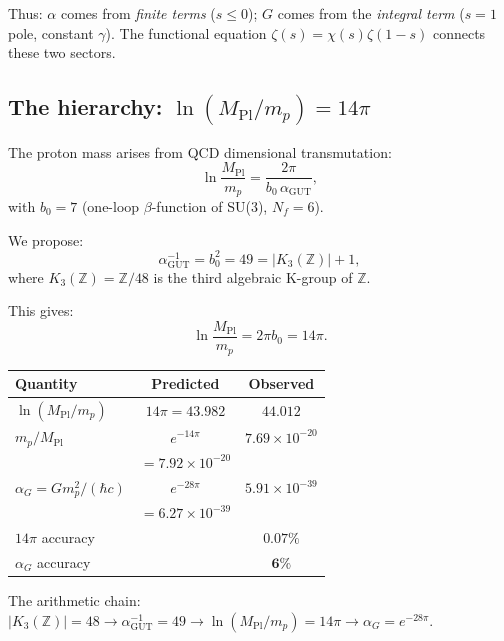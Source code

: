 \documentclass[aps,prd,twocolumn,superscriptaddress,nofootinbib]{revtex4-2}
\begin{document}
Thus: $\alpha$ comes from \emph{finite terms} ($s\leq 0$);
$G$ comes from the \emph{integral term} ($s=1$ pole, constant
$\gamma$).  The functional equation
$\zeta(s)=\chi(s)\zeta(1{-}s)$ connects these two sectors.

\subsection{The hierarchy: $\ln(M_{\mathrm{Pl}}/m_p)=14\pi$}

The proton mass arises from QCD dimensional transmutation:
\begin{equation}
  \ln\frac{M_{\mathrm{Pl}}}{m_p}=\frac{2\pi}{b_0\,\alpha_{\mathrm{GUT}}},
\end{equation}
with $b_0=7$ (one-loop $\beta$-function of SU(3), $N_f=6$).

We propose:
\begin{equation}\label{eq:alphaGUT}
  \alpha_{\mathrm{GUT}}^{-1}=b_0^2=49=|K_3(\mathbb{Z})|+1,
\end{equation}
where $K_3(\mathbb{Z})=\mathbb{Z}/48$ is the third algebraic
K-group of $\mathbb{Z}$.

This gives:
\begin{equation}\label{eq:14pi}
  \ln\frac{M_{\mathrm{Pl}}}{m_p}=2\pi b_0=14\pi.
\end{equation}

\begin{center}
\begin{tabular}{lcc}
\toprule
Quantity & Predicted & Observed \\
\midrule
$\ln(M_{\mathrm{Pl}}/m_p)$ & $14\pi=43.982$ & $44.012$ \\
$m_p/M_{\mathrm{Pl}}$ & $e^{-14\pi}$ & $7.69\times 10^{-20}$ \\
 & $=7.92\times 10^{-20}$ & \\
$\alpha_G=Gm_p^2/(\hbar c)$ & $e^{-28\pi}$ & $5.91\times 10^{-39}$ \\
 & $=6.27\times 10^{-39}$ & \\
\midrule
\multicolumn{2}{l}{$14\pi$ accuracy} & $\mathbf{0.07\%}$ \\
\multicolumn{2}{l}{$\alpha_G$ accuracy} & $\mathbf{6\%}$ \\
\bottomrule
\end{tabular}
\end{center}

The arithmetic chain: $|K_3(\mathbb{Z})|=48\to
\alpha_{\mathrm{GUT}}^{-1}=49\to\ln(M_{\mathrm{Pl}}/m_p)=14\pi\to
\alpha_G=e^{-28\pi}$.
\end{document}
